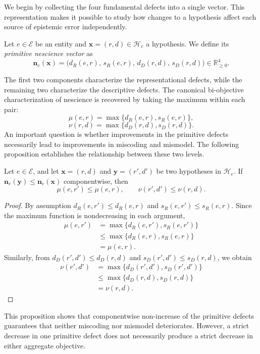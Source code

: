 We begin by collecting the four fundamental defects into a single vector. This representation makes it possible to study how changes to a hypothesis affect each source of epistemic error independently.

\begin{definition}
Let $e\in\mathcal E$ be an entity and $\mathbf{x}=(r,d)\in\mathcal H_e$ a hypothesis. We define its \emph{primitive nescience vector}  as
\[
\mathbf n_e(\mathbf{x}) = \bigl(d_R(e,r),\, s_R(e,r),\, d_D(r,d),\, s_D(r,d) \bigr)
\in\mathbb R_{\geq0}^4.
\]
\end{definition}

The first two components characterize the representational defects, while the remaining two characterize the descriptive defects. The canonical bi-objective characterization of nescience is recovered by taking the maximum within each pair:
\[
\mu(e,r)=\max\{d_R(e,r),s_R(e,r)\},
\]
\[
\nu(r,d)=\max\{d_D(r,d),s_D(r,d)\}.
\]
An important question is whether improvements in the primitive defects necessarily lead to improvements in miscoding and mismodel. The following proposition establishes the relationship between these two levels.

\begin{proposition}
Let $e\in\mathcal E$, and let $\mathbf{x}=(r,d)$ and $\mathbf{y}=(r',d')$ be two hypotheses in $\mathcal H_e$. If $\mathbf n_e(\mathbf{y}) \leq \mathbf n_e(\mathbf{x})$ componentwise, then
\[
\mu(e,r')\leq\mu(e,r), \qquad \nu(r',d')\leq\nu(r,d).
\]
\end{proposition}
\begin{proof}
By assumption $d_R(e,r') \leq d_R(e,r)$ and $s_R(e,r')\leq s_R(e,r)$. Since the maximum function is nondecreasing in each argument,
\[
\begin{aligned}
\mu(e,r')
&=\max\{d_R(e,r'),s_R(e,r')\}\\
&\leq\max\{d_R(e,r),s_R(e,r)\}\\
&=\mu(e,r).
\end{aligned}
\]
Similarly, from $d_D(r',d')\leq d_D(r,d)$ and $s_D(r',d')\leq s_D(r,d)$, we obtain
\[
\begin{aligned}
\nu(r',d')
&=\max\{d_D(r',d'),s_D(r',d')\}\\
&\leq\max\{d_D(r,d),s_D(r,d)\}\\
&=\nu(r,d).
\end{aligned}
\]
\end{proof}

This proposition shows that componentwise non-increase of the primitive defects guarantees that neither miscoding nor mismodel deteriorates. However, a strict decrease in one primitive defect does not necessarily produce a strict decrease in either aggregate objective.

